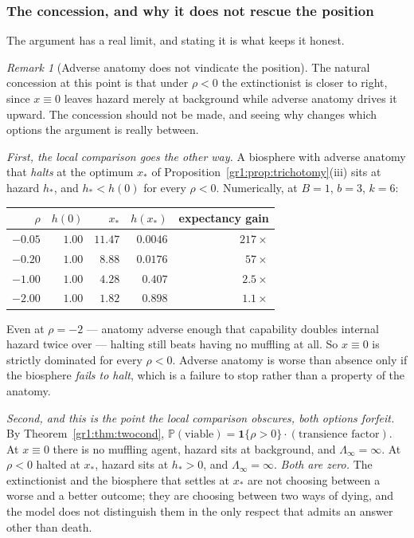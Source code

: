 \documentclass[11pt]{article}
\numberwithin{equation}{section}
\theoremstyle{plain}
\theoremstyle{definition}
\theoremstyle{remark}
\newtheorem{remark}[theorem]{Remark}
\newcommand{\PP}{\mathbb{P}}
\newcommand{\one}{\mathbf{1}}
\begin{document}
\subsubsection{The concession, and why it does not rescue the position}
\label{hr:subsub:concession}

The argument has a real limit, and stating it is what keeps it honest.

\begin{remark}[Adverse anatomy does not vindicate the position]
\label{hr:rem:concession}
The natural concession at this point is that under $\rho<0$ the
extinctionist is closer to right, since $x\equiv0$ leaves hazard merely
at background while adverse anatomy drives it upward. The concession
should not be made, and seeing why changes which options the argument is
really between.

\emph{First, the local comparison goes the other way.} A biosphere with
adverse anatomy that \emph{halts} at the optimum $x_\ast$ of
Proposition~\ref{gr1:prop:trichotomy}(iii) sits at hazard $h_\ast$, and
$h_\ast<h(0)$ for every $\rho<0$. Numerically, at $B=1$, $b=3$, $k=6$:
\begin{center}\small
\begin{tabular}{@{}rrrrr@{}}
\toprule
$\rho$ & $h(0)$ & $x_\ast$ & $h(x_\ast)$ & expectancy gain\\
\midrule
$-0.05$ & $1.00$ & $11.47$ & $0.0046$ & $217\times$\\
$-0.20$ & $1.00$ & $8.88$ & $0.0176$ & $57\times$\\
$-1.00$ & $1.00$ & $4.28$ & $0.407$ & $2.5\times$\\
$-2.00$ & $1.00$ & $1.82$ & $0.898$ & $1.1\times$\\
\bottomrule
\end{tabular}
\end{center}
Even at $\rho=-2$ --- anatomy adverse enough that capability doubles
internal hazard twice over --- halting still beats having no muffling at
all. So $x\equiv0$ is strictly dominated for every $\rho<0$. Adverse
anatomy is worse than absence only if the biosphere \emph{fails to
halt}, which is a failure to stop rather than a property of the anatomy.

\emph{Second, and this is the point the local comparison obscures, both
options forfeit.} By Theorem~\ref{gr1:thm:twocond},
$\PP(\text{viable})=\one\{\rho>0\}\cdot(\text{transience factor})$. At
$x\equiv0$ there is no muffling agent, hazard sits at background, and
$\Lambda_\infty=\infty$. At $\rho<0$ halted at $x_\ast$, hazard sits at
$h_\ast>0$, and $\Lambda_\infty=\infty$. \emph{Both are zero.} The
extinctionist and the biosphere that settles at $x_\ast$ are not
choosing between a worse and a better outcome; they are choosing between
two ways of dying, and the model does not distinguish them in the only
respect that admits an answer other than death.


\end{remark}
\end{document}
